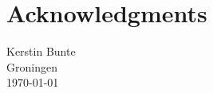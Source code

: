 \chapter*{Acknowledgments}
\pagestyle{empty}

\vspace{-1cm} 


{\flushright Kerstin Bunte\\ Groningen\\ \today\\ }